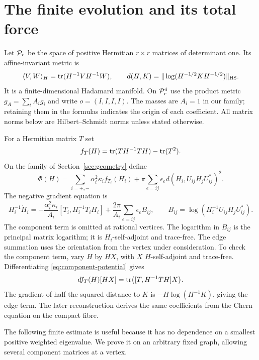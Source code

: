 \section{The finite evolution and its total force}\label{sec:finite}

Let $\mathcal P_r$ be the space of positive Hermitian $r\times r$ matrices
of determinant one. Its affine-invariant metric is
\[
 \langle V,W\rangle_H=\operatorname{tr}(H^{-1}VH^{-1}W),
 \qquad
 d(H,K)=\|\log(H^{-1/2}KH^{-1/2})\|_{\mathrm{HS}}.
\]
It is a finite-dimensional Hadamard manifold. On $\mathcal P_r^4$ use the
product metric $g_A=\sum_i A_i g_i$ and write $o=(I,I,I,I)$.
The masses are $A_i=1$ in our family; retaining them in the formulas
indicates the origin of each coefficient. All matrix norms below are
Hilbert--Schmidt norms unless stated otherwise.

For a Hermitian matrix $T$ set
\begin{equation}\label{eq:component-potential}
 f_T(H)=\operatorname{tr}(TH^{-1}TH)-\operatorname{tr}(T^2).
\end{equation}
On the family of Section~\ref{sec:geometry} define
\begin{equation}\label{eq:potential}
 \Phi(H)=\sum_{i=+,-}\alpha_i^2\kappa_i f_{T_i}(H_i)
       +\pi\sum_{e=ij}\epsilon_e d(H_i,U_{ij}H_jU_{ij}^*)^2.
\end{equation}
The negative gradient equation is
\begin{equation}\label{eq:finite-flow}
 H_i^{-1}\dot H_i
 =-\frac{\alpha_i^2\kappa_i}{A_i}
       [T_i,H_i^{-1}T_iH_i]
  +\frac{2\pi}{A_i}\sum_{e=ij}\epsilon_e B_{ij},
 \qquad B_{ij}=\log(H_i^{-1}U_{ij}H_jU_{ij}^*).
\end{equation}
The component term is omitted at rational vertices. The logarithm in
$B_{ij}$ is the principal matrix logarithm; it is $H_i$-self-adjoint
and trace-free. The edge summation uses the orientation from the vertex
under consideration. To check the component term, vary $H$ by $HX$,
with $X$ $H$-self-adjoint and trace-free. Differentiating
\eqref{eq:component-potential} gives
\[
 df_T(H)[HX]=\operatorname{tr}\bigl([T,H^{-1}TH]X\bigr).
\]
The gradient of half the squared distance to $K$ is
$-H\log(H^{-1}K)$, giving the edge term. The later reconstruction
derives the same coefficients from the Chern equation on the compact
fibre.

The following finite estimate is useful because it has no dependence
on a smallest positive weighted eigenvalue. We prove it on an arbitrary
fixed graph, allowing several component matrices at a vertex.


